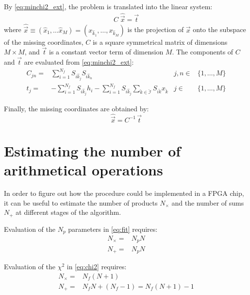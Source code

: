 \documentclass[a4paper,11pt]{article}
\begin{document}
By \eqref{eq:minchi2_ext},
the problem is translated into the linear system:
\begin{align}
  \label{eq:syst}
  C \; \hat{\vec x} = \vec t
\end{align}
where
$\hat{\vec x} \equiv \left( \hat x_1, \ldots \hat x_M \right) = 
 \left(x_{\hat k_1}, \ldots, x_{\hat k_M} \right) $
is the projection of $\vec x$ onto the subspace of the missing coordinates,
$C$ is a square symmetrical matrix of dimensions $M \times M$,
and $\vec t$ is a constant vector term of dimension $M$.
The components of $C$ and $\vec t$ are evaluated from \eqref{eq:minchi2_ext}:
\begin{subequations}
  \label{eq:CT}
  \begin{align}
    \label{eq:C}
    C_{j n} = & \sum_{i=1}^{N_f} S_{i\hat k_j} S_{i\hat k_n} & j,n \in &
    \{ 1,\ldots, M \}\\
    \label{eq:T}
    t_{j } = & -\sum_{i=1}^{N_f} S_{i\hat k_j}h_i
    -\sum_{i=1}^{N_f} S_{i\hat k_j}  \sum_{\check k \in \check{\mathcal
        I}} S_{i\check k} x_{\check k}& j \in & \{1, \ldots, M \} 
  \end{align}
\end{subequations}

Finally, the missing coordinates are obtained by:
\begin{equation}
  \label{eq:solution}
  \hat{\vec x} = C^{-1} \, \vec t
\end{equation}

\section{Estimating the number of arithmetical operations}
\label{sec:extimate}

In order to figure out how the procedure could be implemented
in a FPGA chip, it can be useful to estimate the number
of products $N_\times$ and the number of sums $N_+$
at different stages of the algorithm.

Evaluation of the $N_p$ parameters in \eqref{eq:fit} requires:
\begin{subequations}
  \begin{align}
    N_\times =& N_p N \\
    N_+ =& N_p N
  \end{align}
\end{subequations}

Evaluation of the $\chi^2$ in \eqref{eq:chi2} requires:
\begin{subequations}
\label{eq:chi2_ncalc}
  \begin{align}
    N_\times =& N_f (N+1)\\
    N_+ =& N_f N + (N_f-1) = N_f (N+1) - 1
  \end{align}
\end{subequations}
\end{document}
